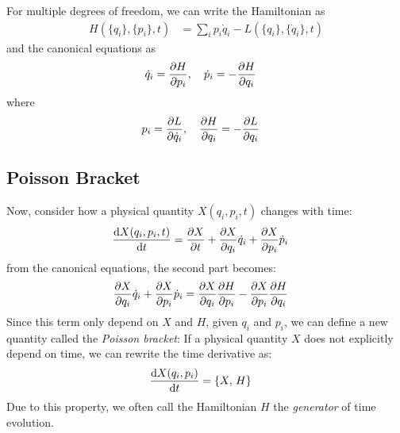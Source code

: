 For multiple degrees of freedom, we can write the Hamiltonian as
\begin{align}
  H(\{q_i\}, \{ p_i\}, t) & = \sum_i p_i \dot{q}_i - L(\{q_i\}, \{\dot{q}_i\}, t)
\end{align}
and the canonical equations as
\begin{align}
  \dot{q}_i & = \pdv{H}{p_i}, \quad \dot{p}_i = - \pdv{H}{q_i} \label{eq:hamilton-canonical-eq}
\end{align}
where
\begin{align}
  p_i & = \pdv{L}{\dot{q}_i}, \quad \pdv{H}{q_i} = - \pdv{L}{q_i}
\end{align}

\subsection{Poisson Bracket}
Now, consider how a physical quantity $X(q_i, p_i, t)$ changes with time:
\begin{align}
  \odv{X(q_i, p_i, t)}{t} & = \pdv{X}{t} + \pdv{X}{q_i} \dot{q}_i + \pdv{X}{p_i} \dot{p}_i
\end{align}
from the canonical equations, the second part becomes:
\begin{align}
  \pdv{X}{q_i} \dot{q}_i + \pdv{X}{p_i} \dot{p}_i & = \pdv{X}{q_i} \pdv{H}{p_i} - \pdv{X}{p_i} \pdv{H}{q_i}
\end{align}
Since this term only depend on $X$ and $H$, given $q_i$ and $p_i$, we can define a new quantity called the \emph{Poisson bracket}:
If a physical quantity $X$ does not explicitly depend on time, we can rewrite the time derivative as:
\begin{align}
  \odv{X(q_i, p_i)}{t} & = \pobra{X}{H}
\end{align}
Due to this property, we often call the Hamiltonian $H$ the \emph{generator} of time evolution.

